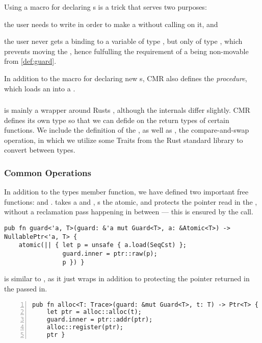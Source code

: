 Using a macro for declaring s is a trick that serves two purposes:
\begin{enumerate*}[1) ]
  \item the user needs to write  in order to make a  without calling
     on it,
  and\item the user never gets a binding to a variable of type , but only of type
    , which prevents moving the , hence fulfulling the requirement of a
     being non-movable from \cref{def:guard}.
\end{enumerate*}

In addition to the  macro for declaring new s, CMR also defines the
 \emph{procedure}, which loads an  into a .


\subsubsection{}

 is mainly a wrapper around Rusts , although the internals differ
slightly. CMR defines its own type so that we can defide on the return types of certain functions.
We include the definition of the , as well as , the compare-and-swap
operation, in which we utilize some Traits from the Rust standard library to convert between types.




\subsubsection{Common Operations}

In addition to the types member function, we have defined two important free functions:
 and .
 takes a  and , s the atomic, and protects
the pointer read in the , without a reclamation pass happening in between --- this is
ensured by the  call.

\begin{lstlisting}
pub fn guard<'a, T>(guard: &'a mut Guard<T>, a: &Atomic<T>) -> NullablePtr<'a, T> {
    atomic(|| { let p = unsafe { a.load(SeqCst) };
                guard.inner = ptr::raw(p);
                p }) }
\end{lstlisting}
 is similar to , as it just wraps  in addition
to protecting the pointer returned in the  passed in.
\begin{lstlisting}[numbers=left, numberstyle=\color{gray}\ttfamily{}A]
pub fn alloc<T: Trace>(guard: &mut Guard<T>, t: T) -> Ptr<T> {
    let ptr = alloc::alloc(t);
    guard.inner = ptr::addr(ptr);
    alloc::register(ptr);
    ptr }
\end{lstlisting}

